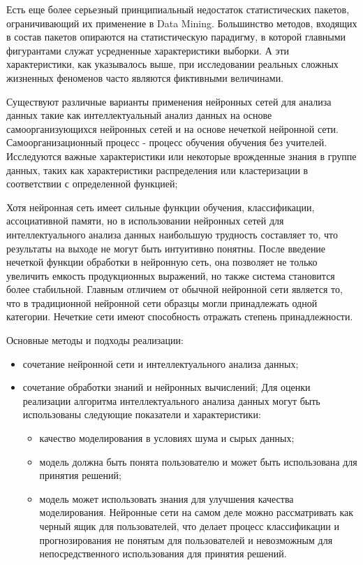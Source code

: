 Есть еще более серьезный принципиальный недостаток статистических пакетов, ограничивающий их применение в Data Mining. Большинство методов, входящих в состав пакетов опираются на статистическую парадигму, в которой главными фигурантами служат усредненные характеристики выборки. А эти характеристики, как указывалось выше, при исследовании реальных сложных жизненных феноменов часто являются фиктивными величинами. 

Существуют различные варианты применения нейронных сетей для анализа данных такие как  
интеллектуальный анализ данных на основе самоорганизующихся нейронных сетей и на основе нечеткой нейронной сети.
Самоорганизационный процесс - процесс обучения обучения без учителей. Исследуются 
важные характеристики или некоторые врожденные знания в группе данных, таких как
характеристики распределения или кластеризации в соответствии с определенной функцией;

Хотя нейронная сеть имеет сильные функции обучения, классификации, ассоциативной памяти, 
но в использовании нейронных сетей для интеллектуального анализа данных наибольшую трудность составляет то, что
 результаты на выходе не могут быть интуитивно понятны. 
 После введение нечеткой функции обработки в нейронную сеть, 
 она позволяет не только увеличить емкость продукционных выражений, но также система становится более стабильной. 
 Главным отличием от обычной нейронной сети является то, что в традиционной нейронной сети образцы могли принадлежать
одной категории. Нечеткие сети имеют способность отражать степень принадлежности.

Основные методы и подходы реализации:
\begin{itemize}
\item сочетание нейронной сети и интеллектуального анализа данных;
\item сочетание обработки знаний и нейронных вычислений;
Для оценки реализации алгоритма интеллектуального анализа данных
могут быть использованы следующие показатели и характеристики:
\begin{itemize}
\item качество моделирования в условиях шума и сырых данных;
\item модель должна быть понята пользователю и может быть использована для принятия решений;
\item модель может использовать знания для улучшения качества моделирования. 
Нейронные сети на самом деле можно рассматривать как черный ящик для пользователей, что делает процесс 
классификации и прогнозирования не понятым для пользователей и
невозможным для непосредственного использования для принятия решений.
\end{itemize}
\end{itemize}

